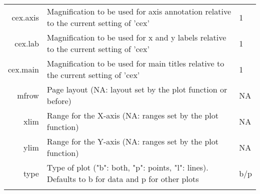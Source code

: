 \begin{table}[h]
\begin{center}
\begin{tabular}{r p{10cm} p{3cm}}
{\sf cex.axis} & Magnification to be used for axis annotation relative to the current setting of 'cex' & 1 \\
{\sf cex.lab} & Magnification to be used for x and y labels relative to the current setting of 'cex' & 1 \\
{\sf cex.main} & Magnification to be used for main titles relative to the current setting of 'cex' & 1 \\
{\sf mfrow} & Page layout (NA: layout set by the plot function or before) & NA \\
{\sf xlim} & Range for the X-axis (NA: ranges set by the plot function) & NA \\
{\sf ylim} & Range for the Y-axis (NA: ranges set by the plot function) & NA \\
{\sf type} & Type of plot ("b": both, "p": points, "l": lines). Defaults to b for data and p for other plots & b/p \\
& & \\
\hline
\end{tabular} 
\end{center}
\end{table} 


